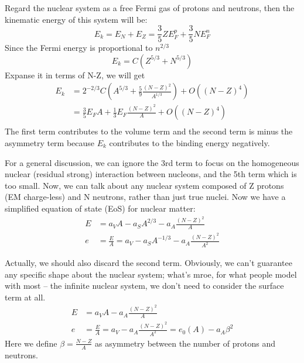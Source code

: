 Regard the nuclear system as a free Fermi gas of protons and neutrons, then the 
kinematic energy of this system will be:
$$ E_k = E_N + E_Z = \frac{3}{5}ZE_F^p + \frac{3}{5}NE_F^n $$
Since the Fermi energy is proportional to $n^{2/3}$
$$ E_k = C(Z^{5/3} + N^{5/3})  $$
Expanse it in terms of N-Z, we will get
\begin{equation*}
    \begin{aligned}
	E_k &= 2^{-2/3}C\left(A^{5/3} + \frac{5}{9}\frac{(N-Z)^2}{A^{1/3}} \right) + O((N-Z)^4) \\
	    &= \frac{3}{5} E_F A + \frac{1}{3}E_F\frac{(N-Z)^2}{A} + O((N-Z)^4) \\
    \end{aligned}
\end{equation*}
The first term contributes to the volume term and the second term is minus the 
asymmetry term because $E_k$ contributes to the binding energy negatively.

For a general discussion, we can ignore the 3rd term to focus on the homogeneous
nuclear (residual strong) interaction between nucleons, and the 5th term which is too small.
Now, we can talk about any nuclear system composed of Z protons (EM charge-less) 
and N neutrons, rather than just true nuclei. Now we have a simplified equation
of state (EoS) for nuclear matter:
\begin{equation}
    \label{eq:modified-mass-formula-1}
    \begin{aligned}
	E &= a_V A - a_S A^{2/3} - a_A\frac{(N-Z)^2}{A}  \\
	e &= \frac{E}{A} = a_V - a_S A^{-1/3} - a_A\frac{(N-Z)^2}{A^2}
    \end{aligned}
\end{equation}

Actually, we should also discard the second term. Obviously, we can't guarantee
any specific shape about the nuclear system; what's mroe, for what people model
with most -- the infinite nuclear system, we don't need to consider the surface 
term at all.
\begin{equation}
    \label{eq:modified-mass-formula-2}
    \begin{aligned}
	E &= a_V A - a_A\frac{(N-Z)^2}{A}  \\
	e &= \frac{E}{A} = a_V - a_A\frac{(N-Z)^2}{A^2} = e_0(A) - a_A\beta^2 
    \end{aligned}
\end{equation}
Here we define $\beta = \frac{N-Z}{A}$ as asymmetry between the number of protons and neutrons. 

